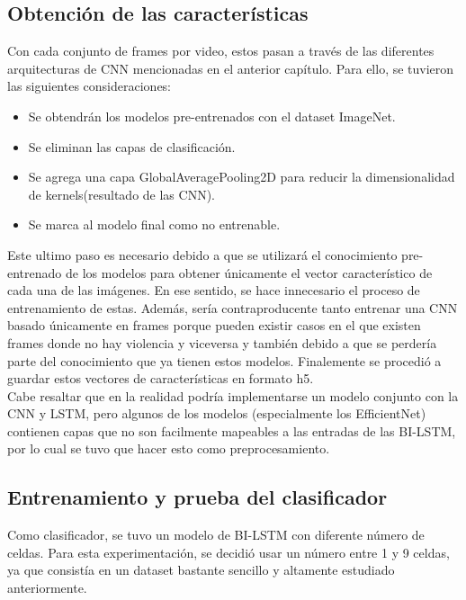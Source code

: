 \subsection{Obtención de las características}

Con cada conjunto de frames por video, estos pasan a través de 
las diferentes arquitecturas de CNN mencionadas en el anterior 
capítulo. Para ello, se tuvieron las siguientes consideraciones: 
\begin{itemize}
    \item Se obtendrán los modelos pre-entrenados con el 
    dataset ImageNet.
    \item Se eliminan las capas de clasificación.
    \item Se agrega una capa GlobalAveragePooling2D para 
    reducir la dimensionalidad de kernels(resultado de las CNN). 
    \item Se marca al modelo final como no entrenable.
\end{itemize}
 
Este ultimo paso es necesario debido a que se utilizará el 
conocimiento pre-entrenado de los modelos para obtener 
únicamente el vector característico de cada una de las 
imágenes. En ese sentido, se hace innecesario el proceso de 
entrenamiento de estas. Además, sería contraproducente tanto 
entrenar una CNN basado únicamente en frames porque pueden 
existir casos en el que existen frames donde no hay violencia 
y viceversa y también debido a que se perdería parte del 
conocimiento que ya tienen estos modelos. Finalemente se 
procedió a guardar estos vectores de características en 
formato h5. \\

Cabe resaltar que en la realidad podría implementarse un 
modelo conjunto con la CNN y LSTM, pero algunos de los modelos 
(especialmente los EfficientNet) contienen capas que no son 
facilmente mapeables a las entradas de las BI-LSTM, por lo 
cual se tuvo que hacer esto como  preprocesamiento.

\subsection{Entrenamiento y prueba del clasificador}

Como clasificador, se tuvo un modelo de BI-LSTM con diferente 
número de celdas. Para esta experimentación, se decidió usar 
un número entre 1 y 9 celdas, ya que consistía en un dataset 
bastante sencillo y altamente estudiado anteriormente. 

